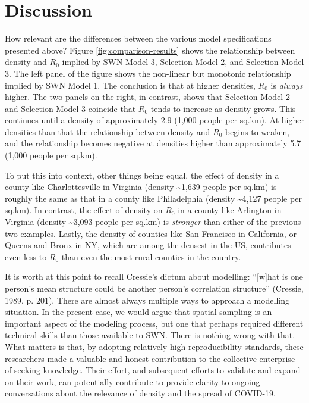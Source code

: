 \documentclass[]{elsarticle} %
\begin{document}
\hypertarget{discussion}{%
\section{Discussion}\label{discussion}}

How relevant are the differences between the various model
specifications presented above? Figure \ref{fig:comparison-results}
shows the relationship between density and \(R_0\) implied by SWN Model
3, Selection Model 2, and Selection Model 3. The left panel of the
figure shows the non-linear but monotonic relationship implied by SWN
Model 1. The conclusion is that at higher densities, \(R_0\) is
\emph{always} higher. The two panels on the right, in contrast, shows
that Selection Model 2 and Selection Model 3 coincide that \(R_0\) tends
to increase as density grows. This continues until a density of
approximately 2.9 (1,000 people per sq.km). At higher densities than
that the relationship between density and \(R_0\) begins to weaken, and
the relationship becomes negative at densities higher than approximately
5.7 (1,000 people per sq.km).

To put this into context, other things being equal, the effect of
density in a county like Charlottesville in Virginia (density
\textasciitilde1,639 people per sq.km) is roughly the same as that in a
county like Philadelphia (density \textasciitilde4,127 people per
sq.km). In contrast, the effect of density on \(R_0\) in a county like
Arlington in Virginia (density \textasciitilde3,093 people per sq.km) is
\emph{stronger} than either of the previous two examples. Lastly, the
density of counties like San Francisco in California, or Queens and
Bronx in NY, which are among the densest in the US, contributes even
less to \(R_0\) than even the most rural counties in the country.

It is worth at this point to recall Cressie's dictum about modelling:
``{[}w{]}hat is one person's mean structure could be another person's
correlation structure'' (Cressie, 1989, p. 201). There are almost always
multiple ways to approach a modelling situation. In the present case, we
would argue that spatial sampling is an important aspect of the modeling
process, but one that perhaps required different technical skills than
those available to SWN. There is nothing wrong with that. What matters
is that, by adopting relatively high reproducibility standards, these
researchers made a valuable and honest contribution to the collective
enterprise of seeking knowledge. Their effort, and subsequent efforts to
validate and expand on their work, can potentially contribute to provide
clarity to ongoing conversations about the relevance of density and the
spread of COVID-19.
\end{document}
